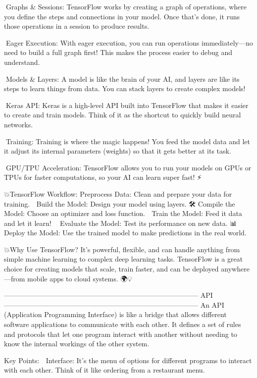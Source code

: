 🔹Graphs & Sessions:
TensorFlow works by creating a graph of operations, where you define the steps and connections in your model. Once that’s done, it runs those operations in a session to produce results. 🧠🔗

🔹Eager Execution:
With eager execution, you can run operations immediately—no need to build a full graph first! This makes the process easier to debug and understand. 🔄

🔹Models & Layers:
A model is like the brain of your AI, and layers are like its steps to learn things from data. You can stack layers to create complex models! 🧑‍🏫🧠

🔹Keras API:
Keras is a high-level API built into TensorFlow that makes it easier to create and train models. Think of it as the shortcut to quickly build neural networks. 🔧

🔹Training:
Training is where the magic happens! You feed the model data and let it adjust its internal parameters (weights) so that it gets better at its task. 💪

🔹GPU/TPU Acceleration:
TensorFlow allows you to run your models on GPUs or TPUs for faster computations, so your AI can learn super fast! ⚡

💥TensorFlow Workflow:
Preprocess Data: Clean and prepare your data for training. 🧹
Build the Model: Design your model using layers. 🛠️
Compile the Model: Choose an optimizer and loss function. 📝
Train the Model: Feed it data and let it learn! 🧑‍🏫
Evaluate the Model: Test its performance on new data. 📊
Deploy the Model: Use the trained model to make predictions in the real world. 🚀

💥Why Use TensorFlow?
It’s powerful, flexible, and can handle anything from simple machine learning to complex deep learning tasks. TensorFlow is a great choice for creating models that scale, train faster, and can be deployed anywhere—from mobile apps to cloud systems. 🌍💡

------------------------------------------------------------------------------------
API🤖
------------------------------------------------------------------------------------
An API (Application Programming Interface) is like a bridge that allows different software applications to communicate with each other. It defines a set of rules and protocols that let one program interact with another without needing to know the internal workings of the other system. 🚀

Key Points:
🔷 Interface:
It’s the menu of options for different programs to interact with each other. Think of it like ordering from a restaurant menu.

